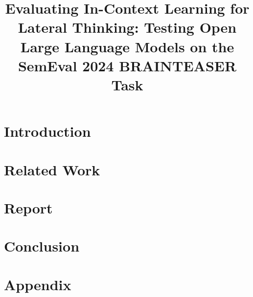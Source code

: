 \documentclass{scrartcl}
\title{Evaluating In-Context Learning for Lateral Thinking: Testing Open Large Language Models on the SemEval 2024 BRAINTEASER Task}
\begin{document}


\tableofcontents
\clearpage
\listoffigures
\clearpage
\listoftables
\clearpage
{}
\section{Introduction}


\section{Related Work}


\section{Report}


\section{Conclusion}


\clearpage
\appendix
\section{Appendix}


\clearpage
\printbibliography
\end{document}
